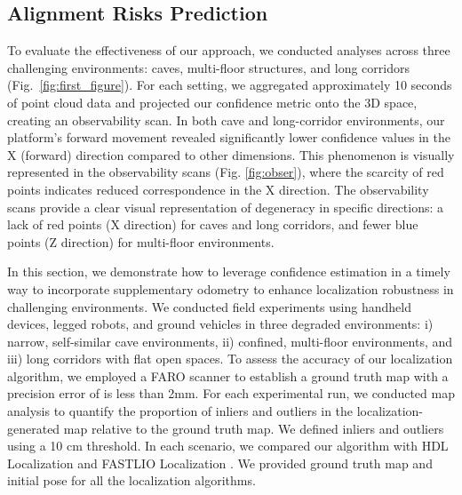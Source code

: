 \subsection{Alignment Risks Prediction}
To evaluate the effectiveness of our approach, we conducted analyses across three challenging environments: caves, multi-floor structures, and long corridors (Fig.~\ref{fig:first_figure}). For each setting, we aggregated approximately 10 seconds of point cloud data and projected our confidence metric onto the 3D space, creating an observability scan.
In both cave and long-corridor environments, our platform's forward movement revealed significantly lower confidence values in the X (forward) direction compared to other dimensions. This phenomenon is visually represented in the observability scans (Fig. \ref{fig:obser}), where the scarcity of red points indicates reduced correspondence in the X direction.
The observability scans provide a clear visual representation of degeneracy in specific directions: a lack of red points (X direction) for caves and long corridors, and fewer blue points (Z direction) for multi-floor environments.






In this section, we demonstrate how to leverage confidence estimation in a timely way to incorporate supplementary odometry to enhance localization robustness in challenging environments. We conducted field experiments using handheld devices, legged robots, and ground vehicles in three degraded environments:
i)   narrow, self-similar cave environments,
ii)  confined, multi-floor environments, and
iii) long corridors with flat open spaces.
To assess the accuracy of our localization algorithm, we employed a FARO scanner to establish a ground truth map with a precision error of is less than 2mm. For each experimental run, we conducted map analysis to quantify the proportion of inliers and outliers in the localization-generated map relative to the ground truth map. We defined inliers and outliers using a 10 cm threshold. In each scenario, we compared our algorithm with HDL Localization \cite{koide2019portable} and FASTLIO Localization \cite{xu2021fast}. We provided ground truth map and initial pose for all the localization algorithms.

